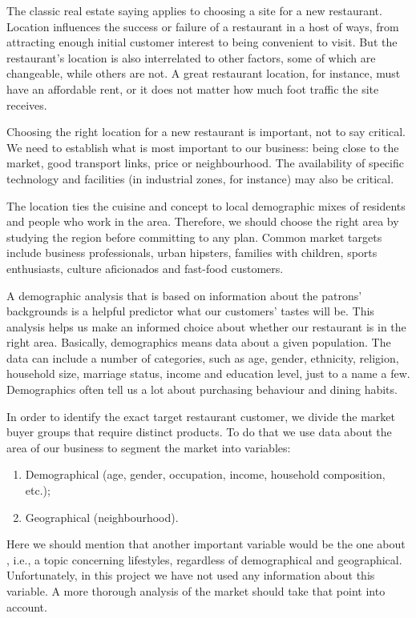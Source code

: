 \documentclass[a4paper,11pt]{amsart}
\begin{document}
The classic real estate saying  applies to choosing a site for a new restaurant. Location influences the success or failure of a restaurant in a host of ways, from attracting enough initial customer interest to being convenient to visit. But the restaurant’s location is also interrelated to other factors, some of which are changeable, while others are not. A great restaurant location, for instance, must have an affordable rent, or it does not matter how much foot traffic the site receives.

Choosing the right location for a new restaurant is important, not to say critical. We need to establish what is most important to our business: being close to the market, good transport links, price or neighbourhood. The availability of specific technology and facilities (in industrial zones, for instance) may also be critical.

The location ties the cuisine and concept to local demographic mixes of residents and people who work in the area. Therefore, we should choose the right area by studying the region before committing to any plan. Common market targets include business professionals, urban hipsters, families with children, sports enthusiasts, culture aficionados and fast-food customers. 

A demographic analysis that is based on information about the patrons' backgrounds is a helpful predictor what our customers' tastes will be. This analysis helps us make an informed choice about whether our restaurant is in the right area. Basically, demographics means data about a given population. The data can include a number of categories, such as age, gender, ethnicity, religion, household size, marriage status, income and education level, just to a name a few. Demographics often tell us a lot about purchasing behaviour and dining habits.

In order to identify the exact target restaurant customer, we divide the market buyer groups that require distinct products. To do that we use data about the area of our business to segment the market into variables:

\begin{enumerate}[$\diamond$]
\item  Demographical (age, gender, occupation, income, household composition, etc.);
\item Geographical (neighbourhood).
\end{enumerate}
Here we should mention that another important variable would be the one about , i.e., a topic concerning lifestyles, regardless of demographical and geographical. Unfortunately, in this project we have not used any information about this variable. A more thorough analysis of the market should take that point into account. 
\end{document}

